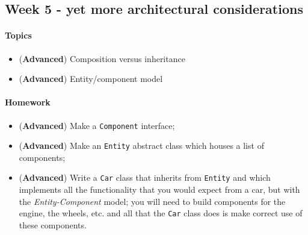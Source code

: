 \documentclass[12pt,a4paper,draft]{article}
\begin{document}
		\subsection{Week 5 - yet more architectural considerations}
		\paragraph*{Topics}			
		\begin{itemize}
			\item (\textbf{Advanced}) Composition versus inheritance
			\item (\textbf{Advanced}) Entity/component model
		\end{itemize}
		
		\paragraph*{Homework}
		\begin{itemize}
			\item (\textbf{Advanced}) Make a \texttt{Component} interface;
			\item (\textbf{Advanced}) Make an \texttt{Entity} abstract class which houses a list of components;
			\item (\textbf{Advanced}) Write a \texttt{Car} class that inherits from \texttt{Entity} and which implements all the functionality that you would expect from a car, but with the \textit{Entity-Component} model; you will need to build components for the engine, the wheels, etc. and all that the \texttt{Car} class does is make correct use of these components.
		\end{itemize}
\end{document}
